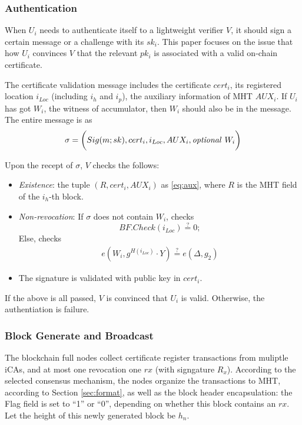 \documentclass[conference]{IEEEtran}
\begin{document}
\subsubsection{Authentication}\label{section:authentication}
When $U_i$ needs to authenticate itself to a lightweight verifier $V$, it should sign a certain message or a challenge with its $sk_i$. This paper focuses on the issue that how $U_i$ convinces $V$ that the relevant $pk_i$ is associated with a valid on-chain certificate.

The certificate validation message includes the certificate $cert_i$, its registered location $i_{Loc}$ (including $i_h$ and $i_p$), the auxiliary information of MHT $AUX_i$. If $U_i$ has got $W_i$, the witness of accumulator, then $W_i$ should also be in the message. The entire message is as 
$$\sigma = \biggl(Sig(m; sk), cert_i, i_{Loc}, AUX_i, \mbox{\textit{optional }} W_i\biggr)$$

Upon the recept of $\sigma$, $V$ checks the follows:
\begin{itemize}
	\item \textit{Existence}: the tuple $(R, cert_i, AUX_i)$ as \eqref{eq:aux}, where $R$ is the MHT field of the $i_h$-th block.
	\item \textit{Non-revocation}: If $\sigma$ does not contain $W_i$, checks $$BF.Check(i_{Loc})\overset{?}{=} 0;$$ Else, checks 
	\begin{align} \label{eq:authenticate}
		e(W_i, g^{H(i_{Loc})}\cdot Y) \overset{?}{=} e(\Delta, g_2)
	\end{align}
	\item The signature is validated with public key in $cert_i$.
\end{itemize}
If the above is all passed, $V$ is convinced that $U_i$ is valid. Otherwise, the authentiation is failure. 


\subsubsection{Block Generate and Broadcast}\label{section:block_consensus}

The blockchain full nodes collect certificate register transactions from muliptle iCAs, and at most one revocation one $rx$ (with signgature $R_x$). According to the selected consensus mechanism, the nodes organize the transactions to MHT, according to Section \ref{sec:format}, as well as the block header encapsulation: the Flag field is set to ``1'' or ``0'', depending on whether this block contains an $rx$. Let the height of this newly generated block be $h_n$.
\end{document}
